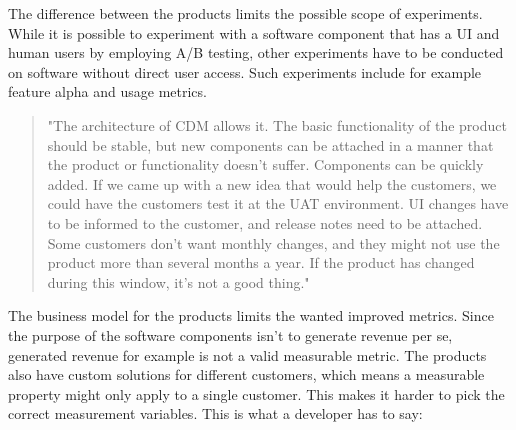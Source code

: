 \documentclass[english]{tktltiki2}
\theoremstyle{definition}
\theoremstyle{remark}
\begin{document}


The difference between the products limits the possible scope of experiments. While it is possible to experiment with a software component that has a UI and human users by employing A/B testing, other experiments have to be conducted on software without direct user access. Such experiments include for example feature alpha and usage metrics.

\begin{quote}
"The architecture of CDM allows it. The basic functionality of the product should be stable, but new components can be attached in a manner that the product or functionality doesn't suffer. Components can be quickly added. If we came up with a new idea that would help the customers, we could have the customers test it at the UAT environment. UI changes have to be informed to the customer, and release notes need to be attached. Some customers don't want monthly changes, and they might not use the product more than several months a year. If the product has changed during this window, it's not a good thing."
\end{quote}

The business model for the products limits the wanted improved metrics. Since the purpose of the software components isn't to generate revenue per se, generated revenue for example is not a valid measurable metric. The products also have custom solutions for different customers, which means a measurable property might only apply to a single customer. This makes it harder to pick the correct measurement variables. This is what a developer has to say:
\end{document}
